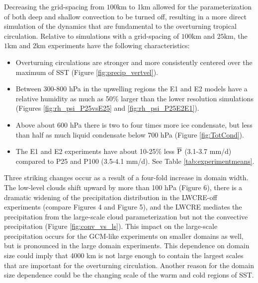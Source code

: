\documentclass[draft]{agujournal2019}
\begin{document}
{Decreasing the grid-spacing from $100 \textrm{km}$ to 1km allowed for the parameterization of both deep and shallow 
convection to be turned off, resulting in a more direct simulation of the dynamics that are
fundamental to the overturning tropical circulation.  
Relative to simulations with a grid-spacing of $100 \textrm{km}$ and $25 \textrm{km}$, the $1 \textrm{km}$ and 
$2 \textrm{km}$ experiments have the following characteristics: 
\begin{itemize}
  \item Overturning circulations are stronger and more consistently centered 
  over the maximum of SST (Figure \ref{fig:precip_vertvel}).  
  \item   
  Between 300-800 hPa in the upwelling regions the E1 and E2 
  models have a relative humidity 
  as much as 50\% larger than the lower resolution simulations (Figures \ref{fig:rh_psi_P25vsE25} and \ref{fig:rh_psi_P25E2E1}).  
  \item Above about 600 hPa there is two to four times more ice condensate, but less than half as much liquid condensate below 700 hPa (Figure \ref{fig:TotCond}).
  \item The E1 and E2 experiments have about 10-25\% less $\overline{\rm{P}}$ (3.1-3.7 mm/d) compared to
  P25 and P100 (3.5-4.1 mm/d).  See Table \ref{tab:experimentmeans}.  
\end{itemize}

Three striking changes occur as a result of a four-fold increase in domain width.  The low-level clouds shift 
upward by more than 100 hPa (Figure 6), there is a dramatic widening of the precipitation distribution in the LWCRE-off experiments 
(compare Figures 4 and Figure 5),  
and the LWCRE mediates the precipitation from the large-scale cloud parameterization but not the convective precipitation (Figure \ref{fig:conv_vs_ls}).    
This impact on the large-scale precipitation occurs for the GCM-like experiments on smaller domains as well, 
but is pronounced in the large domain experiments.  
This dependence on domain size could imply that 4000 km is not large enough to contain the largest 
scales that are important for the overturning circulation.  Another reason for the domain 
size dependence could be the changing scale of the warm and cold regions of SST.  

}
\end{document}
